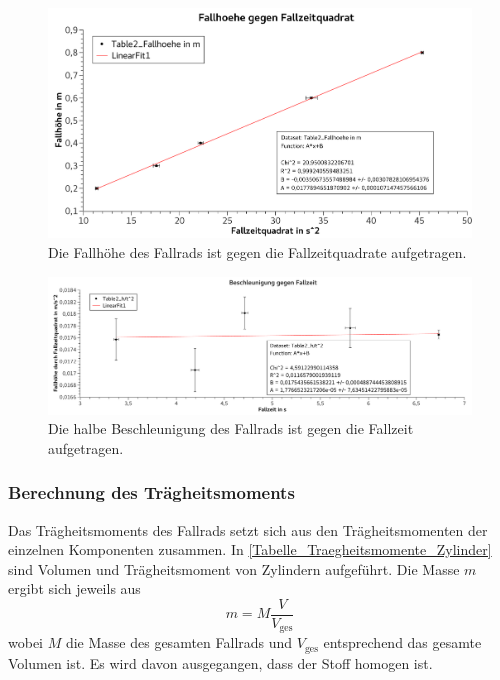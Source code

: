 \documentclass[
	a4paper,
	12pt,
	pagesize,
	ngerman
]{scrartcl}
\begin{document}
	\begin{figure}[tb]
		\includegraphics[width=1\textwidth]{HoeheGegenZeitquadrat} %
		\centering
		\caption{Die Fallhöhe des Fallrads ist gegen die Fallzeitquadrate aufgetragen.}
		\label{HoeheGegenZeitquadrat}
		\centering
	\end{figure}
	\begin{figure}[tb]
		\includegraphics[width=1\textwidth]{BeschleunigungGegenZeit} %
		\centering
		\caption{Die halbe Beschleunigung des Fallrads ist gegen die Fallzeit aufgetragen.}
		\label{BeschleunigungGegenZeit}
		\centering
	\end{figure}



	\subsubsection*{Berechnung des Trägheitsmoments}
	Das Trägheitsmoments des Fallrads setzt sich aus den Trägheitsmomenten der einzelnen Komponenten zusammen.  %
	In \cref{Tabelle_Traegheitsmomente_Zylinder} sind Volumen und Trägheitsmoment von Zylindern aufgeführt. 
	Die Masse $m$ ergibt sich jeweils aus 
	\begin{equation}
		m = M \frac{V}{V_\text{ges}} 
	\end{equation}
	wobei $M$ die Masse des gesamten Fallrads und $V_\text{ges}$ entsprechend das gesamte Volumen ist. Es wird davon ausgegangen, dass der Stoff homogen ist. %
\end{document}
